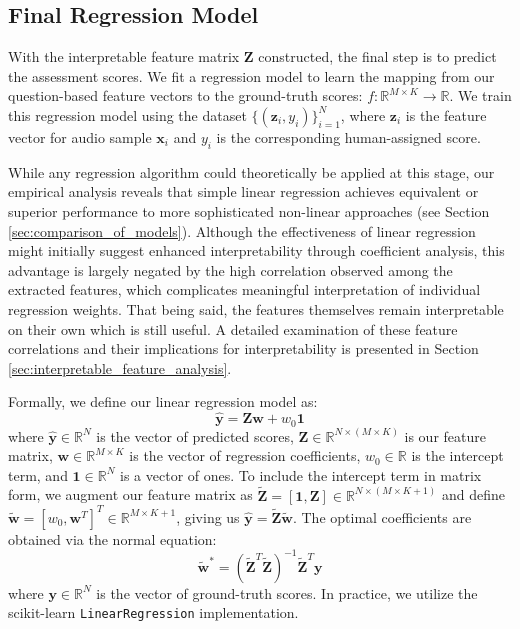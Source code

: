 \documentclass{report}
\begin{document}
\subsection{Final Regression Model}
\label{subsec:final_regression_model}
With the interpretable feature matrix $\mathbf{Z}$ constructed, the final step is to predict the assessment scores. We fit a regression model to learn the mapping from our question-based feature vectors to the ground-truth scores: $f: \mathbb{R}^{M \times K} \to \mathbb{R}$. We train this regression model using the dataset $\{(\mathbf{z}_i, y_i)\}_{i=1}^N$, where $\mathbf{z}_i$ is the feature vector for audio sample $\mathbf{x}_i$ and $y_i$ is the corresponding human-assigned score.

While any regression algorithm could theoretically be applied at this stage, our empirical analysis reveals that simple linear regression achieves equivalent or superior performance to more sophisticated non-linear approaches (see Section \ref{sec:comparison_of_models}). Although the effectiveness of linear regression might initially suggest enhanced interpretability through coefficient analysis, this advantage is largely negated by the high correlation observed among the extracted features, which complicates meaningful interpretation of individual regression weights. That being said, the features themselves remain interpretable on their own which is still useful. A detailed examination of these feature correlations and their implications for interpretability is presented in Section \ref{sec:interpretable_feature_analysis}. 

Formally, we define our linear regression model as:
$$
\hat{\mathbf{y}} = \mathbf{Z}\mathbf{w} + w_0 \mathbf{1}
$$
where $\hat{\mathbf{y}} \in \mathbb{R}^N$ is the vector of predicted scores, $\mathbf{Z} \in \mathbb{R}^{N \times (M \times K)}$ is our feature matrix, $\mathbf{w} \in \mathbb{R}^{M \times K}$ is the vector of regression coefficients, $w_0 \in \mathbb{R}$ is the intercept term, and $\mathbf{1} \in \mathbb{R}^N$ is a vector of ones. To include the intercept term in matrix form, we augment our feature matrix as $\tilde{\mathbf{Z}} = [\mathbf{1}, \mathbf{Z}] \in \mathbb{R}^{N \times (M \times K + 1)}$ and define $\tilde{\mathbf{w}} = [w_0, \mathbf{w}^T]^T \in \mathbb{R}^{M \times K + 1}$, giving us $\hat{\mathbf{y}} = \tilde{\mathbf{Z}}\tilde{\mathbf{w}}$. The optimal coefficients are obtained via the normal equation:
$$
\tilde{\mathbf{w}}^* = (\tilde{\mathbf{Z}}^T\tilde{\mathbf{Z}})^{-1}\tilde{\mathbf{Z}}^T\mathbf{y}
$$
where $\mathbf{y} \in \mathbb{R}^N$ is the vector of ground-truth scores. In practice, we utilize the scikit-learn \citep{scikit-learn} \texttt{LinearRegression} implementation.
\end{document}

